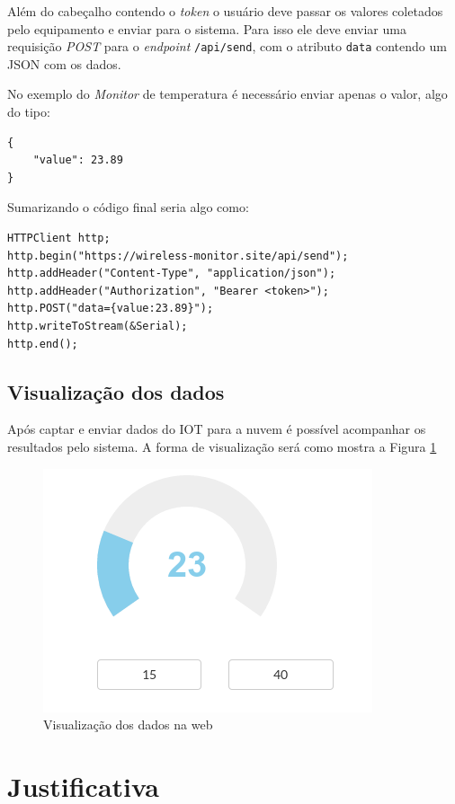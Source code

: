 Além do cabeçalho contendo o \emph{token} o usuário deve passar os
valores coletados pelo equipamento e enviar para o sistema. Para isso
ele deve enviar uma requisição \emph{POST} para o \emph{endpoint}
\texttt{/api/send}, com o atributo \texttt{data} contendo um JSON com os
dados.

No exemplo do \emph{Monitor} de temperatura é necessário enviar apenas o
valor, algo do tipo:

\begin{verbatim}
{
    "value": 23.89
}
\end{verbatim}

Sumarizando o código final seria algo como:

\begin{verbatim}
HTTPClient http;
http.begin("https://wireless-monitor.site/api/send");
http.addHeader("Content-Type", "application/json");
http.addHeader("Authorization", "Bearer <token>");
http.POST("data={value:23.89}");
http.writeToStream(&Serial);
http.end();
\end{verbatim}

\subsection{Visualização dos dados}\label{visualizauxe7uxe3o-dos-dados}

Após captar e enviar dados do IOT para a nuvem é possível acompanhar os
resultados pelo sistema. A forma de visualização será como mostra a
Figura \ref{fig:view-monitor}

\begin{figure}[h]
    \includegraphics[scale=0.5]{img/wm-monitor-temperature.png}
    \caption{Visualização dos dados na web} \label{fig:view-monitor}
\end{figure}

\section{Justificativa}\label{justificativa}

